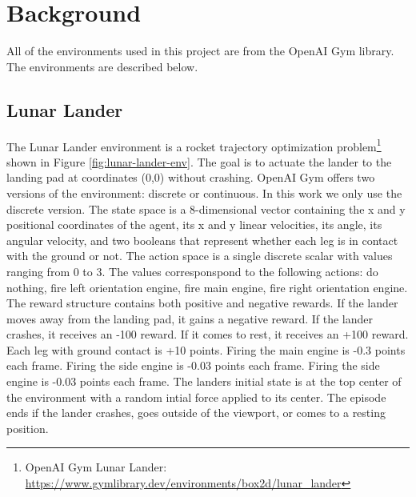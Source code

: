 \section{Background}

All of the environments used in this project are from the OpenAI Gym library\cite{brockman2016openai}. The environments are described below.

\subsection{Lunar Lander}

The Lunar Lander environment is a rocket trajectory optimization  
problem\footnote{OpenAI Gym Lunar Lander: \url{https://www.gymlibrary.dev/environments/box2d/lunar_lander}}
shown in Figure \ref{fig:lunar-lander-env}. The goal is to actuate the lander to the landing pad at coordinates (0,0) without crashing.
OpenAI Gym offers two versions of the environment: discrete or continuous.
In this work we only use the discrete version. 
The state space is a 8-dimensional vector containing the x and y positional coordinates of the agent, its x and y linear velocities,
its angle, its angular velocity, and two booleans that represent whether each leg is in contact with the ground or not.
The action space is a single discrete scalar with values ranging from 0 to 3. The values corresponspond to the following actions: 
do nothing, fire left orientation engine, fire main engine, fire right orientation engine.
The reward structure contains both positive and negative rewards. If the lander moves away from the landing pad, it gains a negative reward.
If the lander crashes, it receives an -100 reward. If it comes to rest, it receives an +100 reward. Each leg with ground contact is +10 points.
Firing the main engine is -0.3 points each frame. Firing the side engine is -0.03 points each frame. Firing the side engine is -0.03 points each frame.
The landers initial state is at the top center of the environment with a random intial force applied to its center. 
The episode ends if the lander crashes, goes outside of the viewport, or comes to a resting position.

